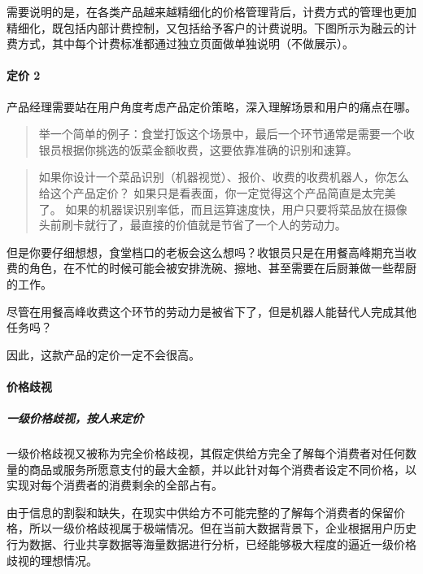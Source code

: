 \documentclass[letterpaper,10pt,english]{sphinxmanual}
\begin{document}
需要说明的是，在各类产品越来越精细化的价格管理背后，计费方式的管理也更加精细化，既包括内部计费控制，又包括给予客户的计费说明。下图所示为融云的计费方式，其中每个计费标准都通过独立页面做单独说明（不做展示）。


\paragraph{定价 2\sphinxfootnotemark[687]}
\label{\detokenize{chapter_knowledge/price:id3}}%
\begin{footnotetext}[687]\sphinxAtStartFootnote
{}
%
\end{footnotetext}\ignorespaces 
产品经理需要站在用户角度考虑产品定价策略，深入理解场景和用户的痛点在哪。
\begin{quote}

举一个简单的例子：食堂打饭这个场景中，最后一个环节通常是需要一个收银员根据你挑选的饭菜金额收费，这要依靠准确的识别和速算。
\end{quote}
\begin{quote}

如果你设计一个菜品识别（机器视觉）、报价、收费的收费机器人，你怎么给这个产品定价？
如果只是看表面，你一定觉得这个产品简直是太完美了。
如果的机器误识别率低，而且运算速度快，用户只要将菜品放在摄像头前刷卡就行了，最直接的价值就是节省了一个人的劳动力。
\end{quote}

但是你要仔细想想，食堂档口的老板会这么想吗？收银员只是在用餐高峰期充当收费的角色，在不忙的时候可能会被安排洗碗、擦地、甚至需要在后厨兼做一些帮厨的工作。

尽管在用餐高峰收费这个环节的劳动力是被省下了，但是机器人能替代人完成其他任务吗？

因此，这款产品的定价一定不会很高。


\paragraph{价格歧视}
\label{\detokenize{chapter_knowledge/price:id4}}

\subparagraph{一级价格歧视，按人来定价}
\label{\detokenize{chapter_knowledge/price:id5}}
一级价格歧视又被称为完全价格歧视，其假定供给方完全了解每个消费者对任何数量的商品或服务所愿意支付的最大金额，并以此针对每个消费者设定不同价格，以实现对每个消费者的消费剩余的全部占有。

由于信息的割裂和缺失，在现实中供给方不可能完整的了解每个消费者的保留价格，所以一级价格歧视属于极端情况。但在当前大数据背景下，企业根据用户历史行为数据、行业共享数据等海量数据进行分析，已经能够极大程度的逼近一级价格歧视的理想情况。
\end{document}

